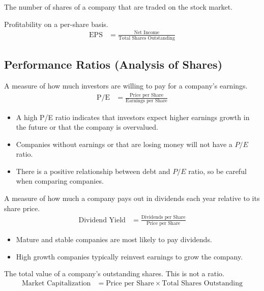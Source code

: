 \begin{definition}
    The number of shares of a company that are traded on the stock market.
\end{definition}

\begin{theorem}
    Profitability on a per-share basis.
    \begin{align}
        \text{EPS} & = \frac{\text{Net Income}}{\text{Total Shares Outstanding}}
    \end{align}
\end{theorem}

\subsection{Performance Ratios (Analysis of Shares)}

\begin{theorem}
    A measure of how much investors are willing to pay for a company's earnings.
    \begin{align}
        \text{P/E} & = \frac{\text{Price per Share}}{\text{Earnings per Share}}
    \end{align}
    \begin{itemize}
        \item A high P/E ratio indicates that investors expect higher earnings growth in the future or that the company is overvalued.
        \item Companies without earnings or that are losing money will not have a $P/E$ ratio.
        \item There is a positive relationship between debt and $P/E$ ratio, so be careful when comparing companies.
    \end{itemize}
\end{theorem}

\begin{theorem}
    A measure of how much a company pays out in dividends each year relative to its share price.
    \begin{align}
        \text{Dividend Yield} & = \frac{\text{Dividends per Share}}{\text{Price per Share}}
    \end{align}
    \begin{itemize}
        \item Mature and stable companies are most likely to pay dividends.
        \item High growth companies typically reinvest earnings to grow the company.
    \end{itemize}
\end{theorem}

\begin{theorem}
    The total value of a company's outstanding shares. This is not a ratio.
    \begin{align}
        \text{Market Capitalization} & = \text{Price per Share} \times \text{Total Shares Outstanding}
    \end{align}
\end{theorem}